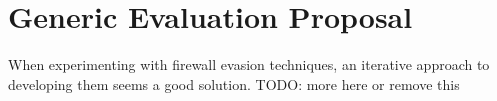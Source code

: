 \section{Generic Evaluation Proposal}
\label{sec:proposal}
When experimenting with firewall evasion techniques, an iterative approach to developing them seems a good solution. 
{\color{red}TODO: more here or remove this}
